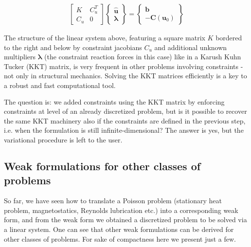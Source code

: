 \documentclass{digitaldynamics}
\def\vect#1{\bm{#1}}
\def\matr#1{{#1}}
\begin{document}
\begin{align}
\boxed{
\begin{bmatrix}
	\matr{K} & \matr{C}_u^T \\
	\matr{C}_u  & \matr{0}
\end{bmatrix}
\begin{Bmatrix}
	\hat{\vect{u}} \\
	\vect{\lambda}
\end{Bmatrix}
=
\begin{Bmatrix}
	\vect{b} \\
	-\vect{C}(\vect{u}_0)
\end{Bmatrix}
}
\end{align}

The structure of the linear system above, featuring a square matrix $\matr{K}$ bordered to the right and below by constraint jacobians $\matr{C}_u$ and additional unknown multipliers $\vect{\lambda}$ (the constraint reaction forces in this case) like in a Karush Kuhn Tucker (KKT) matrix, is very frequent in other problems involving constraints - not only in structural mechanics. Solving the KKT matrices efficiently is a key to a robust and fast computational tool.

The question is: we added constraints using the KKT matrix by enforcing constraints at level of an already discretized problem, but is it possible to recover the same KKT machinery also if the constraints are defined in the previous step, i.e. when the formulation is still infinite-dimensional? The answer is yes, but the variational procedure is left to the user.


\subsection{Weak formulations for other classes of problems}

So far, we have seen how to translate a Poisson problem (stationary heat problem, magnetostatics, Reynolds lubrication etc.) into a corresponding weak form, and from the weak form we obtained a discretized problem to be solved via a linear system. One can see that other weak formulations can be derived for other classes of problems. For sake of compactness here we present just a few.
\end{document}
